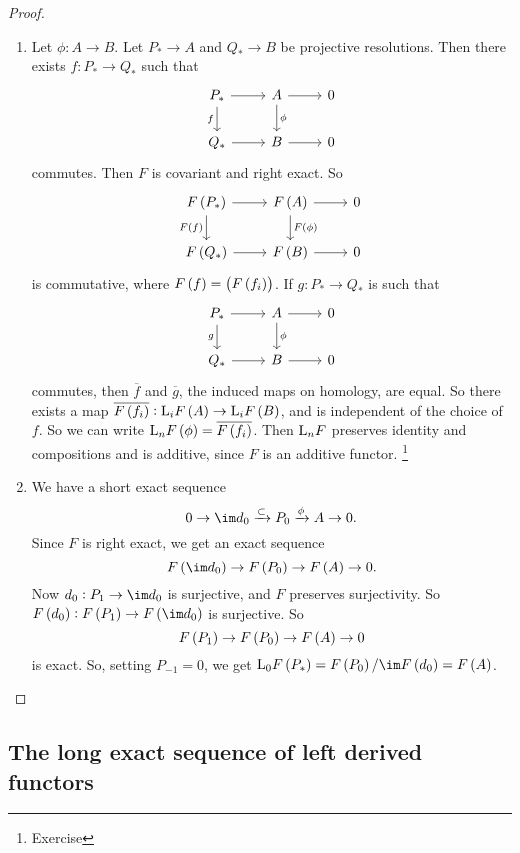 \begin{proof}
\begin{enumerate}
\pagebreak

\item Let $ \phi : A \to B $. Let $ P_* \to A $ and $ Q_* \to B $ be projective resolutions. Then there exists $ f : P_* \to Q_* $ such that
$$
\begin{tikzcd}
P_* \arrow{r} \arrow{d}[swap]{f} & A \arrow{r} \arrow{d}{\phi} & 0 \\
Q_* \arrow{r} & B \arrow{r} & 0
\end{tikzcd}
$$
commutes. Then $ F $ is covariant and right exact. So
$$
\begin{tikzcd}
F\br{P_*} \arrow{r} \arrow{d}[swap]{F\br{f}} & F\br{A} \arrow{r} \arrow{d}{F\br{\phi}} & 0 \\
F\br{Q_*} \arrow{r} & F\br{B} \arrow{r} & 0
\end{tikzcd}
$$
is commutative, where $ F\br{f} = \br{F\br{f_i}} $. If $ g : P_* \to Q_* $ is such that
$$
\begin{tikzcd}
P_* \arrow{r} \arrow{d}[swap]{g} & A \arrow{r} \arrow{d}{\phi} & 0 \\
Q_* \arrow{r} & B \arrow{r} & 0
\end{tikzcd}
$$
commutes, then $ \overline{f} $ and $ \overline{g} $, the induced maps on homology, are equal. So there exists a map $ \overline{F\br{f_i}} : \L_iF\br{A} \to \L_iF\br{B} $, and is independent of the choice of $ f $. So we can write $ \L_nF\br{\phi} = \overline{F\br{f_i}} $. Then $ \mathrm{L}_nF $ preserves identity and compositions and is additive, since $ F $ is an additive functor. \footnote{Exercise}
\item We have a short exact sequence
$$ 0 \to \im d_0 \xrightarrow{\subset} P_0 \xrightarrow{\phi} A \to 0. $$
Since $ F $ is right exact, we get an exact sequence
$$ F\br{\im d_0} \to F\br{P_0} \to F\br{A} \to 0. $$
Now $ d_0 : P_1 \to \im d_0 $ is surjective, and $ F $ preserves surjectivity. So $ F\br{d_0} : F\br{P_1} \to F\br{\im d_0} $ is surjective. So
$$ F\br{P_1} \to F\br{P_0} \to F\br{A} \to 0 $$
is exact. So, setting $ P_{-1} = 0 $, we get $ \L_0F\br{P_*} = F\br{P_0} / \im F\br{d_0} = F\br{A} $.
\end{enumerate}
\end{proof}

\pagebreak

\subsection{The long exact sequence of left derived functors}

